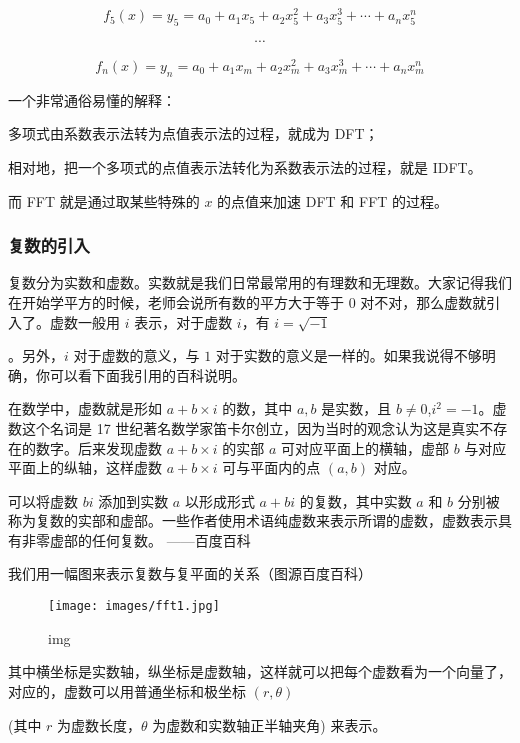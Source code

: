 $$
f_5(x) = y_5 = a_0 + a_1x_5+a_2x_5^2+a_3x_5^3+ \cdots + a_nx_5^n
$$

$$
\cdots
$$

$$
f_n(x) = y_n = a_0 + a_1x_m+a_2x_m^2+a_3x_m^3+ \cdots + a_nx_m^n
$$

一个非常通俗易懂的解释：

多项式由系数表示法转为点值表示法的过程，就成为 DFT；

相对地，把一个多项式的点值表示法转化为系数表示法的过程，就是 IDFT。

而 FFT 就是通过取某些特殊的 $x$ 的点值来加速 DFT 和 FFT 的过程。

\subsubsection{复数的引入}

复数分为实数和虚数。实数就是我们日常最常用的有理数和无理数。大家记得我们在开始学平方的时候，老师会说所有数的平方大于等于 $0$ 对不对，那么虚数就引入了。虚数一般用 $i$ 表示，对于虚数 $i$，有 $i=\sqrt{-1}$

。另外，$i$ 对于虚数的意义，与 $1$ 对于实数的意义是一样的。如果我说得不够明确，你可以看下面我引用的百科说明。

\begin{QUOTE}{}{}
在数学中，虚数就是形如 $a+b \times i$ 的数，其中 $a,b$ 是实数，且 $b \neq 0$,$i^2 = - 1$。虚数这个名词是 17 世纪著名数学家笛卡尔创立，因为当时的观念认为这是真实不存在的数字。后来发现虚数 $a+b \times i$ 的实部 $a$ 可对应平面上的横轴，虚部 $b$ 与对应平面上的纵轴，这样虚数 $a+b \times i$ 可与平面内的点 $(a,b)$ 对应。



可以将虚数 $bi$ 添加到实数 $a$ 以形成形式 $a + bi$ 的复数，其中实数 $a$ 和 $b$ 分别被称为复数的实部和虚部。一些作者使用术语纯虚数来表示所谓的虚数，虚数表示具有非零虚部的任何复数。 ——百度百科
\end{QUOTE}

我们用一幅图来表示复数与复平面的关系（图源百度百科）

\begin{figure}[h]
\centering
\texttt{[image: images/fft1.jpg]} 
\caption{img}
\end{figure}

其中横坐标是实数轴，纵坐标是虚数轴，这样就可以把每个虚数看为一个向量了，对应的，虚数可以用普通坐标和极坐标 $(r,\theta)$

(其中 $r$ 为虚数长度，$\theta$ 为虚数和实数轴正半轴夹角) 来表示。

